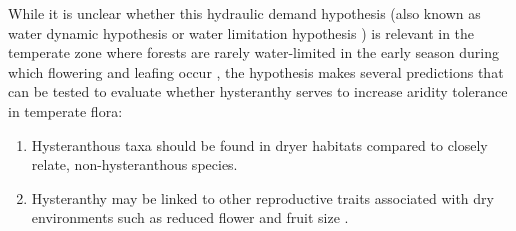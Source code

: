 \documentclass{article}\usepackage[]{graphicx}\usepackage[]{color}
\begin{document}
While it is unclear whether this hydraulic demand hypothesis (also known as water dynamic hypothesis \citep{Gougherty2018} or water limitation hypothesis \citep{Buonaiuto2020}) is relevant in the temperate zone where forests are rarely water-limited  in the early season during which flowering and leafing occur \citep{Polgar2011}, the hypothesis makes several predictions that can be tested to evaluate whether hysteranthy serves to increase aridity tolerance in temperate flora:
\begin{enumerate}
\item Hysteranthous taxa should be found in dryer habitats compared to closely relate, non-hysteranthous species.
\item Hysteranthy may be linked to other reproductive traits associated with dry environments such as reduced flower and fruit size \citep{Herrera:2009aa,Liu:2013ua}.
\end{enumerate}



\end{document}
